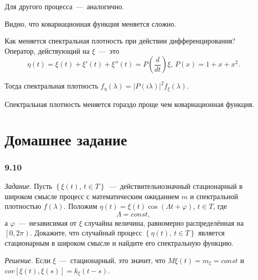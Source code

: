 Для другого процесса~---~аналогично.

Видно, что ковариационная функция меняется сложно.

Как меняется спектральная плотность при действии дифференцирования?
Оператор, действующий на $ \xi $~---~это
\begin{equation*}
  \eta \left( t \right) =
  \xi \left( t \right) + \xi' \left( t \right) + \xi'' \left( t \right) =
  P \left( \frac{d}{dt} \right) \xi, \,
  P \left( x \right) = 1 + x + x^2.
\end{equation*}

Тогда спектральная плотность
$f_{ \eta } \left( \lambda \right) =
  \left| P \left( i \lambda \right) \right|^2
  f_{ \xi } \left( \lambda \right) $.

Спектральная плотность меняется гораздо проще чем ковариационная функция.

\section*{Домашнее задание}

\subsubsection*{9.10}

\textit{Задание.}
Пусть $ \left\{ \xi \left( t \right), \, t \in T \right\} $~---~действительнозначный
стационарный в широком смысле процесс с математическим ожиданием $m$ и спектральной плотностью
$f \left( \lambda \right) $.
Положим
$ \eta \left( t \right) = \xi \left( t \right) \cos \left( \Lambda t + \varphi \right), \,
  t \in T$,
где
\begin{equation*}
  \Lambda =
  const,
\end{equation*}
а $\varphi$~---~независимая от $ \xi $ случайна величина,
равномерно распределённая на $ \left[ 0, 2 \pi \right) $.
Докажите, что случайный процесс $ \left\{ \eta \left( t \right), \, t \in T \right\} $
является стационарным в широком смысле и найдите его спектральную функцию.

\textit{Решение.}
Если $ \xi $~---~стационарный, это значит,
что $M \xi \left( t \right) = m_{ \xi } = const$ и
$cov \left[ \xi \left( t \right), \xi \left( s \right) \right] =
  k_{ \xi } \left( t - s \right) $.

